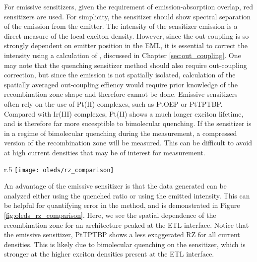 \documentclass[../thesis.tex]{subfiles}
\begin{document}
For emissive sensitizers, given the requirement of emission-absorption overlap, red sensitizers are used.
For simplicity, the sensitizer should show spectral separation of the emission from the emitter.
The intensity of the sensitizer emission is a direct measure of the local exciton density.
However, since the out-coupling is so strongly dependent on emitter position in the EML, it is essential to correct the intensity using a calculation of \oc, discussed in Chapter \ref{sec:out_coupling}.
One may note that the quenching sensitizer method should also require out-coupling correction, but since the emission is not spatially isolated, calculation of the spatially averaged out-coupling effiency would require prior knowledge of the recombination zone shape and therefore cannot be done.
Emissive sensitizers often rely on the use of Pt(II) complexes, such as PtOEP or PtTPTBP.\supercite{Coburn2016a,Hershey2017}
Compared with Ir(III) complexes, Pt(II) shows a much longer exciton lifetime, and is therefore far more sucesptible to bimolecular quenching.\supercite{Mezyk2005}
If the sensitizer is in a regime of bimolecular quenching during the measurement, a compressed version of the recombination zone will be measured.
This can be difficult to avoid at high current densities that may be of interest for measurement.

\begin{wrapfigure}{r}{.5\textwidth}
\texttt{[image: oleds/rz\_comparison]}
\caption{Recombination zone comparison for an emissive sensitizer analyzed using the quenched ratio and the emitted ratio as a function of current density.}
\label{fig:oleds_rz_comparison}
\end{wrapfigure}

An advantage of the emissive sensitizer is that the data generated can be analyzed either using the quenched ratio or using the emitted intensity.
This can be helpful for quantifying error in the method, and is demonstrated in Figure \ref{fig:oleds_rz_comparison}.
Here, we see the spatial dependence of the recombination zone for an architecture peaked at the ETL interface.
Notice that the emissive sensitizer, PtTPTBP shows a less exaggerated RZ for all current densities.  
This is likely due to bimolecular quenching on the sensitizer, which is stronger at the higher exciton densities present at the ETL interface.
\end{document}
